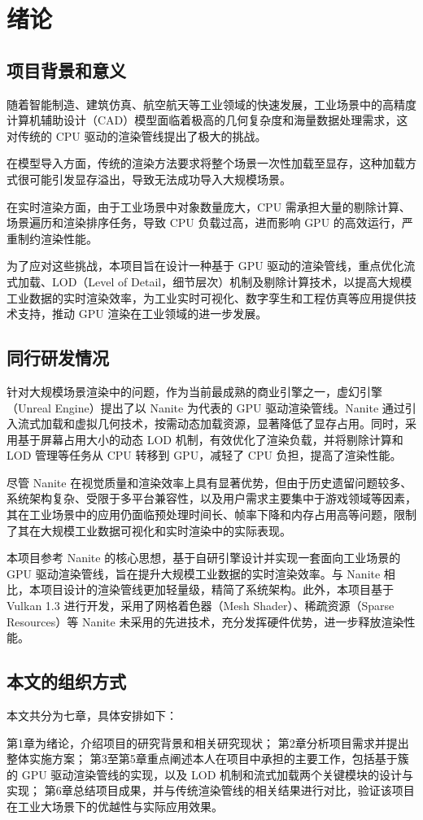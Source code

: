 \cleardoublepage

\section{绪论}

\subsection{项目背景和意义}
随着智能制造、建筑仿真、航空航天等工业领域的快速发展，工业场景中的高精度计算机辅助设计（CAD）模型面临着极高的几何复杂度和海量数据处理需求，这对传统的 CPU 驱动的渲染管线提出了极大的挑战。

在模型导入方面，传统的渲染方法要求将整个场景一次性加载至显存，这种加载方式很可能引发显存溢出，导致无法成功导入大规模场景。

在实时渲染方面，由于工业场景中对象数量庞大，CPU 需承担大量的剔除计算、场景遍历和渲染排序任务，导致 CPU 负载过高，进而影响 GPU 的高效运行，严重制约渲染性能。

为了应对这些挑战，本项目旨在设计一种基于 GPU 驱动的渲染管线，重点优化流式加载、LOD（Level of Detail，细节层次）机制及剔除计算技术，以提高大规模工业数据的实时渲染效率，为工业实时可视化、数字孪生和工程仿真等应用提供技术支持，推动 GPU 渲染在工业领域的进一步发展。

\subsection{同行研发情况}

针对大规模场景渲染中的问题，作为当前最成熟的商业引擎之一，虚幻引擎（Unreal Engine）提出了以 Nanite 为代表的 GPU 驱动渲染管线。Nanite 通过引入流式加载和虚拟几何技术，按需动态加载资源，显著降低了显存占用。同时，采用基于屏幕占用大小的动态 LOD 机制，有效优化了渲染负载，并将剔除计算和 LOD 管理等任务从 CPU 转移到 GPU，减轻了 CPU 负担，提高了渲染性能。

尽管 Nanite 在视觉质量和渲染效率上具有显著优势，但由于历史遗留问题较多、系统架构复杂、受限于多平台兼容性，以及用户需求主要集中于游戏领域等因素，其在工业场景中的应用仍面临预处理时间长、帧率下降和内存占用高等问题，限制了其在大规模工业数据可视化和实时渲染中的实际表现。

本项目参考 Nanite 的核心思想，基于自研引擎设计并实现一套面向工业场景的 GPU 驱动渲染管线，旨在提升大规模工业数据的实时渲染效率。与 Nanite 相比，本项目设计的渲染管线更加轻量级，精简了系统架构。此外，本项目基于 Vulkan 1.3 进行开发，采用了网格着色器（Mesh Shader）、稀疏资源（Sparse Resources）等 Nanite 未采用的先进技术，充分发挥硬件优势，进一步释放渲染性能。

\subsection{本文的组织方式}

本文共分为七章，具体安排如下：

第1章为绪论，介绍项目的研究背景和相关研究现状；
第2章分析项目需求并提出整体实施方案；  
第3至第5章重点阐述本人在项目中承担的主要工作，包括基于簇的 GPU 驱动渲染管线的实现，以及 LOD 机制和流式加载两个关键模块的设计与实现；
第6章总结项目成果，并与传统渲染管线的相关结果进行对比，验证该项目在工业大场景下的优越性与实际应用效果。